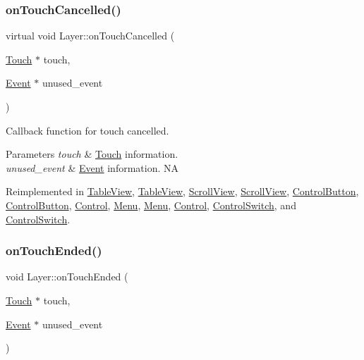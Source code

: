 \subsubsection{\texorpdfstring{on\+Touch\+Cancelled()}{onTouchCancelled()}\hspace{0.1cm}{\footnotesize\ttfamily [2/2]}}
{\footnotesize\ttfamily virtual void Layer\+::on\+Touch\+Cancelled (\begin{DoxyParamCaption}\item[{\hyperlink{classTouch}{Touch} $\ast$}]{touch,  }\item[{\hyperlink{classEvent}{Event} $\ast$}]{unused\+\_\+event }\end{DoxyParamCaption})\hspace{0.3cm}{\ttfamily [virtual]}}

Callback function for touch cancelled.


\begin{DoxyParams}{Parameters}
{\em touch} & \hyperlink{classTouch}{Touch} information. \\
\hline
{\em unused\+\_\+event} & \hyperlink{classEvent}{Event} information.  NA \\
\hline
\end{DoxyParams}


Reimplemented in \hyperlink{classTableView_a5ed81baf58526698abefaf8ca08a6c01}{Table\+View}, \hyperlink{classTableView_a743113e92ef98837c4cfdacf40fd0a0f}{Table\+View}, \hyperlink{classScrollView_a911e0e123c9f120f654744626bfcfd2c}{Scroll\+View}, \hyperlink{classScrollView_a48d7dc926fdbd91707e37167dcf4d36f}{Scroll\+View}, \hyperlink{classControlButton_a32a7a37982d52d6660b532adabb8099e}{Control\+Button}, \hyperlink{classControlButton_a95558febae1ea6790245d093766ba20e}{Control\+Button}, \hyperlink{classControl_ab7fb8582f430d82180dbefea27c4cff9}{Control}, \hyperlink{classMenu_acb29e6ae77c5acba03ac48c5f1b6b23a}{Menu}, \hyperlink{classMenu_a19ffec24a2ec30dd290354e0e0e3aa9a}{Menu}, \hyperlink{classControl_a573efad6a6b492f4a6f4c5d06f0cdb88}{Control}, \hyperlink{classControlSwitch_a31cc47f044081bb65d8490ac1b8900c0}{Control\+Switch}, and \hyperlink{classControlSwitch_aa4c6a2f3766e9916f0619a0249ddd7d7}{Control\+Switch}.

\mbox{\label{classLayer_a9dbcca0eab3b0cd3cdc279615c604413}} 
\subsubsection{\texorpdfstring{on\+Touch\+Ended()}{onTouchEnded()}\hspace{0.1cm}{\footnotesize\ttfamily [1/2]}}
{\footnotesize\ttfamily void Layer\+::on\+Touch\+Ended (\begin{DoxyParamCaption}\item[{\hyperlink{classTouch}{Touch} $\ast$}]{touch,  }\item[{\hyperlink{classEvent}{Event} $\ast$}]{unused\+\_\+event }\end{DoxyParamCaption})\hspace{0.3cm}{\ttfamily [virtual]}}

